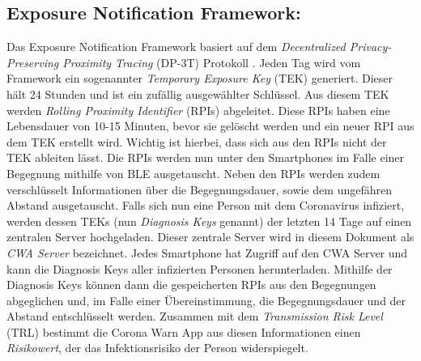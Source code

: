 \documentclass[conference,compsoc]{IEEEtran}
\begin{document}
\subsection{Exposure Notification Framework:} \label{Ex_not_frame}
Das Exposure Notification Framework basiert auf dem \textit{Decentralized Privacy-Preserving Proximity Tracing} (DP-3T) Protokoll \cite{DP-3T}.
Jeden Tag wird vom Framework ein sogenannter \textit{Temporary Exposure Key} (TEK) generiert. Dieser hält 24 Stunden und ist ein zufällig ausgewählter Schlüssel. 
Aus diesem TEK werden \textit{Rolling Proximity Identifier} (RPIs) abgeleitet. 
Diese RPIs haben eine Lebensdauer von 10-15 Minuten, bevor sie gelöscht werden und ein neuer RPI aus dem TEK erstellt wird. Wichtig ist hierbei, 
dass sich aus den RPIs nicht der TEK ableiten lässt. 
Die RPIs werden nun unter den Smartphones im Falle einer Begegnung mithilfe von BLE ausgetauscht. Neben den RPIs werden zudem verschlüsselt Informationen über die Begegnungsdauer, sowie dem ungefähren Abstand ausgetauscht.
Falls sich nun eine Person mit dem Coronavirus infiziert, werden dessen TEKs (nun \textit{Diagnosis Keys} genannt) der letzten 14 Tage auf einen zentralen Server hochgeladen.
Dieser zentrale Server wird in diesem Dokument als \textit{CWA Server} bezeichnet.
Jedes Smartphone hat Zugriff auf den CWA Server und kann die Diagnosis Keys aller infizierten Personen herunterladen.
Mithilfe der Diagnosis Keys können dann die gespeicherten RPIs aus den Begegnungen abgeglichen und, im Falle einer Übereinstimmung, die Begegnungsdauer und der Abstand entschlüsselt werden. 
Zusammen mit dem \textit{Transmission Risk Level} (TRL) bestimmt die Corona Warn App aus diesen Informationen einen \textit{Risikowert}, der das Infektionsrisiko der Person widerspiegelt.
\end{document}
